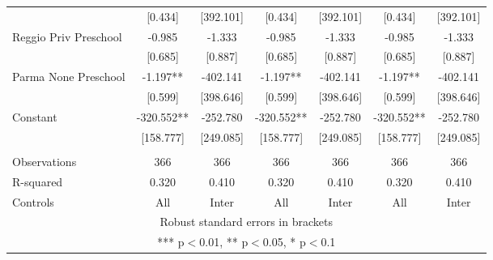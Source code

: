 \begin{tabular}{lcccccc}
 & [0.434] & [392.101] & [0.434] & [392.101] & [0.434] & [392.101] \\
Reggio Priv Preschool & -0.985 & -1.333 & -0.985 & -1.333 & -0.985 & -1.333 \\
 & [0.685] & [0.887] & [0.685] & [0.887] & [0.685] & [0.887] \\
Parma None Preschool & -1.197** & -402.141 & -1.197** & -402.141 & -1.197** & -402.141 \\
 & [0.599] & [398.646] & [0.599] & [398.646] & [0.599] & [398.646] \\
Constant & -320.552** & -252.780 & -320.552** & -252.780 & -320.552** & -252.780 \\
 & [158.777] & [249.085] & [158.777] & [249.085] & [158.777] & [249.085] \\
 &  &  &  &  &  &  \\
Observations & 366 & 366 & 366 & 366 & 366 & 366 \\
R-squared & 0.320 & 0.410 & 0.320 & 0.410 & 0.320 & 0.410 \\
 Controls & All & Inter & All & Inter & All & Inter \\ \hline
\multicolumn{7}{c}{ Robust standard errors in brackets} \\
\multicolumn{7}{c}{ *** p$<$0.01, ** p$<$0.05, * p$<$0.1} \\
\end{tabular}
